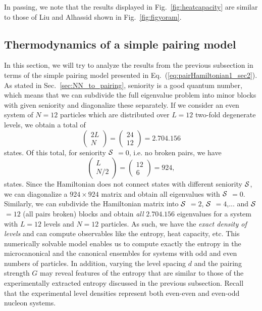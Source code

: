 \documentclass[preprint,rmp,aps,floatfix]{revtex4}
\begin{document}
In passing, we note that the results displayed in Fig.~\ref{fig:heatcapacity}
are similar to those of Liu and Alhassid \cite{liu01} 
shown in Fig.~\ref{fig:figyoram}.

\subsection{Thermodynamics of a simple pairing model}
\label{subsec:statprops}


In this section, we will try to analyze the results from the previous
subsection in terms of the simple pairing model presented in 
Eq.~(\ref{eq:pairHamiltonian1_sec2}). 
As stated in Sec.~\ref{sec:NN_to_pairing}, seniority is
a good quantum number, which 
means that we can subdivide the full eigenvalue problem 
into minor blocks with given seniority and diagonalize these 
separately. 
If we consider an even  system of $N=12$ 
particles which are distributed over $L=12$ two-fold 
degenerate levels, we obtain a total of 
\begin{equation}
\left(\begin{array}{c}2L\\N\end{array}\right)=
\left(\begin{array}{c}24\\12\end{array}\right)=2.704.156
\end{equation}
states. Of this total, for seniority
$\cal{S}$ $=0$, i.e. no broken pairs, we have 
\begin{equation}
\left(\begin{array}{c}L\\N/2\end{array}\right)=
\left(\begin{array}{c}12\\6\end{array}\right)=924,
\end{equation} 
states. Since the Hamiltonian does not connect states with 
different seniority $\cal{S}$, we can diagonalize a 
$924\times 924$ matrix and obtain all eigenvalues with 
$\cal{S}$ $=0$. Similarly, we can subdivide the Hamiltonian 
matrix into $\cal{S}$ $=2$, $\cal{S}$ $=4$,... and 
$\cal{S}$ $=12$ (all pairs broken) blocks and obtain 
{\em all} $2.704.156$ eigenvalues for a system with $L=12$ 
levels and $N=12$ particles. As such, we have the 
{\em exact density of levels} and can compute observables like the 
entropy, heat capacity, etc. This numerically solvable model 
enables us to compute exactly the entropy in the microcanonical 
and the canonical ensembles for systems with odd and even numbers 
of particles.  In addition, varying the level spacing $d$ and the pairing 
strength $G$ may reveal features of the entropy that are 
similar to those of the experimentally extracted entropy discussed
in the previous subsection. Recall that the experimental level densities  
represent both even-even and even-odd nucleon systems.
\end{document}
